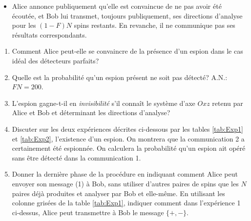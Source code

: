 \begin{enumerate}
{\begin{itemize}
\item Alice annonce publiquement qu'elle est convaincue de ne pas avoir été
écoutée, et Bob lui transmet, toujours publiquement, ses directions d'analyse
pour les $(1-F)N$ spins restants. En revanche, il ne communique pas ses
résultats correspondants.
\end{itemize}
}

\begin{enumerate}
 \item Comment Alice peut-elle se convaincre de la présence d'un espion dans le
cas idéal des détecteurs parfaits?

 \item Quelle est la probabilité qu'un espion présent ne soit pas détecté?
A.N.: $FN=200$.

\item L'espion gagne-t-il en \emph{invisibilité} s'il connaît le système d'axe
$Oxz$ retenu par Alice et Bob et déterminant les directions d'analyse?

\item Discuter sur les deux expériences décrites ci-dessous par les tables
\ref{tab:Exp1} et \ref{tab:Exp2}, l'existence d'un espion. On montrera que la
communication 2 a certainement été espionnée. On calculera la probabilité qu'un
espion ait opéré sans être détecté dans la communication 1.

\item Donner la dernière phase de la procédure en indiquant comment Alice peut
envoyer son message (1) à Bob, sans utiliser d'autres paires de spins que les
$N$ paires déjà produites et analyser par Bob et elle-même. En utilisant les
colonne grisées de la table \ref{tab:Exp1}, indiquer comment dans l'expérience 1
ci-dessus, Alice peut transmettre à Bob le message $\{+,-\}$.
\end{enumerate}

\end{enumerate}

